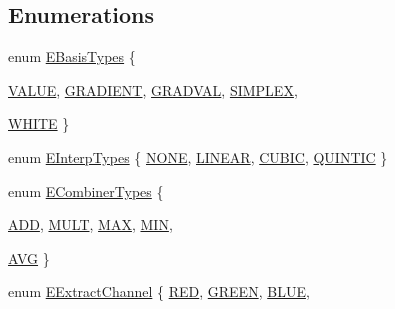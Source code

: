 \subsection*{Enumerations}
\begin{DoxyCompactItemize}
\item 
enum \hyperlink{namespaceanl_ab7af374c31ed4646e3eac0ecedf32c28}{EBasisTypes} \{ \par
\hyperlink{namespaceanl_ab7af374c31ed4646e3eac0ecedf32c28ac768e0d3266964fb083a04b8a3c9a5ca}{VALUE}, 
\hyperlink{namespaceanl_ab7af374c31ed4646e3eac0ecedf32c28a01c68fb7e9f71955ca79e2d92dba1c8b}{GRADIENT}, 
\hyperlink{namespaceanl_ab7af374c31ed4646e3eac0ecedf32c28acaac6d4df26769ca94992b5a82c48c6b}{GRADVAL}, 
\hyperlink{namespaceanl_ab7af374c31ed4646e3eac0ecedf32c28a230241cdf261f575e0e2d8cf65adebdf}{SIMPLEX}, 
\par
\hyperlink{namespaceanl_ab7af374c31ed4646e3eac0ecedf32c28ae74b5c0ece7ccda17ebaa5e5551ee222}{WHITE}
 \}
\item 
enum \hyperlink{namespaceanl_ad37644d3254289e61fdeb1221f25a4e8}{EInterpTypes} \{ \hyperlink{namespaceanl_ad37644d3254289e61fdeb1221f25a4e8a8401efcb00c355bec53277d4f0f456da}{NONE}, 
\hyperlink{namespaceanl_ad37644d3254289e61fdeb1221f25a4e8a34faffd43fdac77dabbcf0382c394e1a}{LINEAR}, 
\hyperlink{namespaceanl_ad37644d3254289e61fdeb1221f25a4e8a4665bfc3808bef4e37c6f5d1d2a1f975}{CUBIC}, 
\hyperlink{namespaceanl_ad37644d3254289e61fdeb1221f25a4e8a63497960bbb306d5dfd43d4ad4333931}{QUINTIC}
 \}
\item 
enum \hyperlink{namespaceanl_af939b7c1f8bc368d125e0b103cb4f363}{ECombinerTypes} \{ \par
\hyperlink{namespaceanl_af939b7c1f8bc368d125e0b103cb4f363abfa610d85de9f64edc50015b74cfbd60}{ADD}, 
\hyperlink{namespaceanl_af939b7c1f8bc368d125e0b103cb4f363a1332d7fa7e174a3305c6c4036b5236b2}{MULT}, 
\hyperlink{namespaceanl_af939b7c1f8bc368d125e0b103cb4f363a0fabbd415f4fcfaa207e2419c398892b}{MAX}, 
\hyperlink{namespaceanl_af939b7c1f8bc368d125e0b103cb4f363a53e4f91aa1c2aa5ccbb1ffc7105ccaa9}{MIN}, 
\par
\hyperlink{namespaceanl_af939b7c1f8bc368d125e0b103cb4f363a25f057da9dc93535b53c89a307d615bd}{AVG}
 \}
\item 
enum \hyperlink{namespaceanl_a9bb9d0b1905b91d898e1d8a44e613d8e}{EExtractChannel} \{ \hyperlink{namespaceanl_a9bb9d0b1905b91d898e1d8a44e613d8ea914123b9eeb9f0a7715ab4b66b3b3416}{RED}, 
\hyperlink{namespaceanl_a9bb9d0b1905b91d898e1d8a44e613d8ea93928ee5c12496c90e3a88ca20699331}{GREEN}, 
\hyperlink{namespaceanl_a9bb9d0b1905b91d898e1d8a44e613d8ea0221a2bb5602f99d84047eea36506d03}{BLUE}, 

\end{DoxyCompactItemize}
